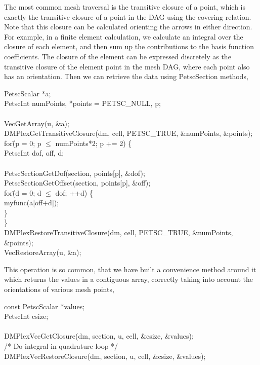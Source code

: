 {{The most common mesh traversal is the transitive closure of a point, which is exactly the transitive closure of a point
in the DAG using the covering relation. Note that this closure can be calculated orienting the arrows in either
direction. For example, in a finite element calculation, we calculate an integral over the closure of each element, and
then sum up the contributions to the basis function coefficients. The closure of the element can be expressed discretely
as the transitive closure of the element point in the mesh DAG, where each point also has an orientation. Then we can
retrieve the data using PetscSection methods,
\begin{tabbing}
  PetscScalar *a;\\
  PetscInt     numPoints, *points = PETSC\_NULL, p;\\
\\
  VecGetArray(u, \&a);\\
  DMPlexGetTransitiveClosure(dm, cell, PETSC\_TRUE, \&numPoints, \&points);\\
  for\=(p = 0; p ${}\le{}$ numPoints*2; p += 2) \{\\
    \>PetscInt dof, off, d;\\
\\
    \>PetscSectionGetDof(section, points[p], \&dof);\\
    \>PetscSectionGetOffset(section, points[p], \&off);\\
    \>for\=(d = 0; d ${}\le{}$ dof; ++d) \{\\
      \>\>myfunc(a[off+d]);\\
    \>\}\\
  \}\\
  DMPlexRestoreTransitiveClosure(dm, cell, PETSC\_TRUE, \&numPoints, \&points);\\
  VecRestoreArray(u, \&a);
\end{tabbing}
This operation is so common, that we have built a convenience method around it which returns the values in a contiguous
array, correctly taking into account the orientations of various mesh points,
\begin{tabbing}
  const PetscScalar *values;\\
  PetscInt           csize;\\
\\
  DMPlexVecGetClosure(dm, section, u, cell, \&csize, \&values);\\
  /* Do integral in quadrature loop */\\
  DMPlexVecRestoreClosure(dm, section, u, cell, \&csize, \&values);\\

\end{tabbing}}}
